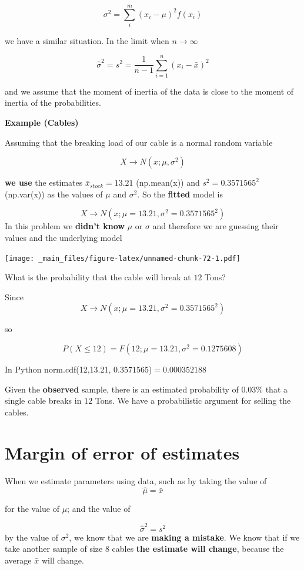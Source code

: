 \documentclass[
]{book}
\begin{document}
\[\sigma^2=\sum_{i}^m(x_i-\mu)^2f(x_i)\]

we have a similar situation. In the limit when \(n \rightarrow \infty\)

\[\hat{\sigma}^2=s^2=\frac{1}{n-1}\sum_{i=1}^n(x_i-\bar{x})^2\]

and we assume that the moment of inertia of the data is close to the moment of inertia of the probabilities.

\textbf{Example (Cables)}

Assuming that the breaking load of our cable is a normal random variable

\[X \rightarrow N(x; \mu, \sigma^2)\]

\textbf{we use} the estimates \(\bar{x}_{stock}=13.21\) (np.mean(x)) and \(s^2=0.3571565^2\) (np.var(x)) as the values of \(\mu\) and \(\sigma^2\). So the \textbf{fitted} model is

\[X \rightarrow N(x; \mu=13.21, \sigma^2=0.3571565^2)\]
In this problem we \textbf{didn't know} \(\mu\) or \(\sigma\) and therefore we are guessing their values and the underlying model

\texttt{[image: \_main\_files/figure-latex/unnamed-chunk-72-1.pdf]}

What is the probability that the cable will break at \(12\) Tons?

Since \[X \rightarrow N(x; \mu=13.21, \sigma^2=0.3571565^2)\]

so

\[P(X \leq 12)= F(12; \mu=13.21, \sigma^2=0.1275608)\]

In Python norm.cdf(12,13.21, 0.3571565)\(=0.000352188\)

Given the \textbf{observed} sample, there is an estimated probability of \(0.03\%\) that a single cable breaks in \(12\) Tons. We have a probabilistic argument for selling the cables.

\hypertarget{margin-of-error-of-estimates}{%
\section{Margin of error of estimates}\label{margin-of-error-of-estimates}}

When we estimate parameters using data, such as by taking the value of \[\hat{\mu}=\bar{x}\]

for the value of \(\mu\); and the value of

\[\hat{\sigma}^2=s^2\]
by the value of \(\sigma^2\), we know that we are \textbf{making a mistake}. We know that if we take another sample of size \(8\) cables \textbf{the estimate will change}, because the average \(\bar{x}\) will change.
\end{document}
